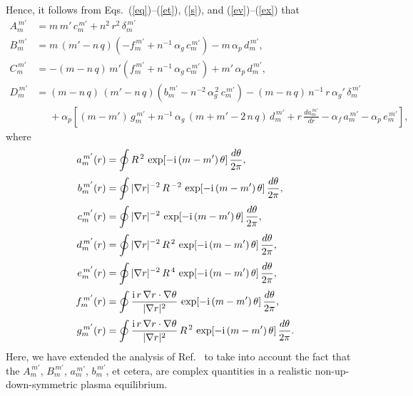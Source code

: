 \documentclass[12pt,prb,aps]{revtex4-1}
\begin{document}
Hence, it follows from Eqs.~(\ref{eq})--(\ref{et}), (\ref{s}), and (\ref{ev})--(\ref{ex}) that\,\cite{am3}
\begin{align}\label{e104}
A_m^{\,m'}&= m\,m'\,c_m^{\,m'} + n^2\,r^2\,\delta_m^{\,m'}\\[0.5ex]
B_m^{\,m'}&= m\,(m'-n\,q)\left(-f_m^{\,m'}+n^{-1}\,\alpha_g\,c_m^{\,m'}\right) -m\,\alpha_p\,d_m^{\,m'},\\[0.5ex]
C_m^{\,m'}&= -(m-n\,q)\,m'\left(f_m^{\,m'}+n^{-1}\,\alpha_g\,c_m^{\,m'}\right)+m'\,\alpha_p\,d_m^{\,m'},\\[0.5ex]
D_m^{\,m'}&= (m-n\,q)\,(m'-n\,q)\left(b_m^{\,m'}-n^{-2}\,\alpha_g^{\,2}\,c_m^{\,m'}\right) - (m-n\,q)\,n^{-1}\,r\,\alpha_g'\,\delta_m^{\,m'}\label{e107}\\[0.5ex]
&\phantom{=} + 
\alpha_p\left[(m-m')\,g_m^{\,m'}+n^{-1}\,\alpha_g\,(m+m'-2\,n\,q)\,d_m^{\,m'} + r\,\frac{d a_m^{\,m'}}{dr}-\alpha_f\,a_m^{\,m'}
-\alpha_p\,e_m^{\,m'}\right],\nonumber
\end{align}
where
\begin{align}\label{e108}
a_m^{\,m'}(r) &= \oint R^{\,2}\,\exp[-{\rm i}\,(m-m')\,\theta]\,\frac{d\theta}{2\pi},\\[0.5ex]
b_m^{\,m'}(r) &= \oint |\nabla r|^{-2}\,R^{\,-2}\,\exp[-{\rm i}\,(m-m')\,\theta]\,\frac{d\theta}{2\pi},\\[0.5ex]
c_m^{\,m'}(r) &= \oint |\nabla r|^{-2}\,\exp[-{\rm i}\,(m-m')\,\theta]\,\frac{d\theta}{2\pi},\\[0.5ex]
d_m^{\,m'}(r) &= \oint |\nabla r|^{-2}\,R^{\,2}\,\exp[-{\rm i}\,(m-m')\,\theta]\,\frac{d\theta}{2\pi},\\[0.5ex]
e_m^{\,m'}(r) &= \oint |\nabla r|^{-2}\,R^{\,4}\,\exp[-{\rm i}\,(m-m')\,\theta]\,\frac{d\theta}{2\pi},\\[0.5ex]
f_m^{\,m'}(r) &= \oint \frac{{\rm i}\,r\,\nabla r\cdot\nabla\theta}{|\nabla r|^2}\,\exp[-{\rm i}\,(m-m')\,\theta]\,\frac{d\theta}{2\pi},\label{fdef}\\[0.5ex]
g_m^{\,m'}(r) &= \oint \frac{{\rm i}\,r\,\nabla r\cdot\nabla\theta}{|\nabla r|^2}\,R^{\,2}\,\exp[-{\rm i}\,(m-m')\,\theta]\,\frac{d\theta}{2\pi}.\label{e114}
\end{align}
Here, we have extended the analysis of Ref.~ to take into account the fact that the $A_m^{\,m'}$, $B_m^{\,m'}$, $a_m^{\,m'}$, $b_m^{\,m'}$, et cetera,
are complex quantities in a realistic non-up-down-symmetric plasma equilibrium. 
\end{document}
